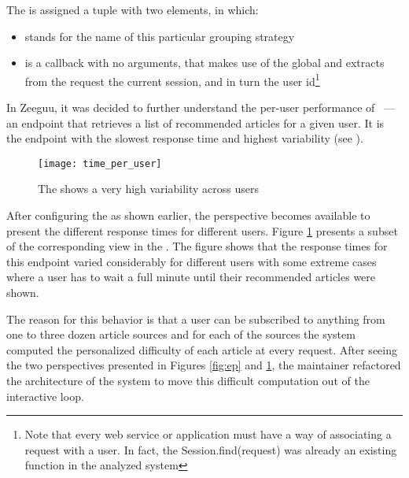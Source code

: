The  is assigned a tuple with two elements, in which:  

\begin{itemize}
	\item {} stands for the name of this particular grouping strategy
	\item {} is a callback with no arguments, 
	that makes use of the global  and extracts from 
	the request the current session, and in turn the user id\footnote{
		Note that every web service or application must have a way of 
		associating a request with a user. In fact, the Session.find(request) 
		was already an existing function in the analyzed system}
\end{itemize}


In Zeeguu, it was decided to further understand the per-user performance of \epFeedItems
~---  an endpoint that retrieves a list of recommended articles for a given user.
It is the endpoint with the slowest response time and highest variability (see ). 


\begin{figure}[h!]
  \centering
  \texttt{[image: time\_per\_user]}
  \caption{The \epFeedItems shows a very high variability across users}
  \label{fig:tpu}
\end{figure}


After configuring the \tool as shown earlier, the  perspective becomes available to  present the different response times for different users. Figure \ref{fig:tpu} presents a subset of the corresponding view in the \tool. The figure shows that the response times for this endpoint varied considerably for different users with some extreme cases where a user has to wait a full minute until their recommended articles were shown. 

The reason for this behavior is that a user can be subscribed to anything from one to three dozen 
article sources and for each of the sources the system computed the personalized difficulty 
of each article at every request. After seeing the two perspectives presented in Figures \ref{fig:ep} and \ref{fig:tpu}, the \zee maintainer refactored the architecture of the system to move this difficult computation out of the interactive loop.






